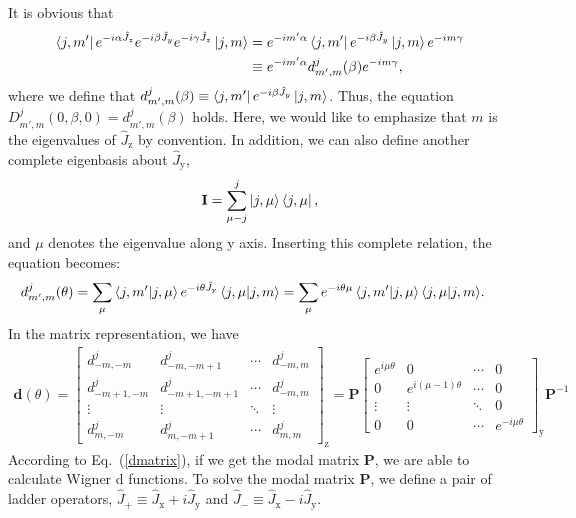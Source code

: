 \documentclass[journal=jacsat,manuscript=article,layout=traditional]{achemso}
\begin{document}
It is obvious that
\begin{align}
    \nonumber
    \bra{j,m'}e^{-i\alpha \hat{J}_z}e^{-i\beta \hat{J}_y}e^{-i\gamma \hat{J}_z}\ket{j,m}
    &=e^{-im'\alpha}\bra{j,m'}e^{-i\beta \hat{J}_y}\ket{j,m}e^{-im\gamma}\\
    &\equiv e^{-im'\alpha}d_{m',m}^j(\beta)e^{-im\gamma},
\end{align}
where we define that $d_{m',m}^j(\beta)\equiv\bra{j,m'}e^{-i\beta \hat{J}_y}\ket{j,m}$.
Thus, the equation $D_{m',m}^j(0,\beta,0)=d_{m',m}^j(\beta)$ holds.
Here, we would like to emphasize that $m$ is the eigenvalues of $\hat{J}_\mathrm{z}$ by convention.
In addition, we can also define another complete eigenbasis about $\hat{J}_\mathrm{y}$,
\begin{align}
    \mathbf{I}=\sum_{\mu-j}^j\ket{j,\mu}\bra{j,\mu},
\end{align}
and $\mu$ denotes the eigenvalue along y axis. 
Inserting this complete relation, the equation becomes:
\begin{align}
    d_{m',m}^{j}(\theta) &= \sum_\mu{\bra{j,m'}\ket{j,\mu}e^{-i\theta \hat{J}_\mathrm{y}}\bra{j,\mu}\ket{j,m}}
    = \sum_\mu{e^{-i\theta \mu}\bra{j,m'}\ket{j,\mu}\bra{j,\mu}\ket{j,m}}.
\end{align}
In the matrix representation, we have
\begin{align}
    \label{dmatrix}
    \mathbf{d}(\theta) =
    \begin{bmatrix}
    d_{-m,-m}^j & d_{-m,-m+1}^j & \cdots & d_{-m,m}^j\\
    d_{-m+1,-m}^j & d_{-m+1,-m+1}^j & \cdots & d_{-m,m}^j\\
    \vdots & \vdots & \ddots & \vdots\\
    d_{m,-m}^j & d_{m,-m+1}^j & \cdots & d_{m,m}^j
    \end{bmatrix}_\mathrm{z}
    = \mathbf{P}\begin{bmatrix}
    e^{i\mu\theta} & 0 & \cdots & 0\\
    0 & e^{i(\mu-1)\theta} & \cdots & 0\\
    \vdots & \vdots &\ddots & 0\\
    0 & 0 & \cdots & e^{-i\mu\theta}
    \end{bmatrix}_\mathrm{y}
    \mathbf{P}^{-1}
\end{align}
According to Eq.~(\ref{dmatrix}), if we get the modal matrix $\mathbf{P}$, we are able to calculate Wigner d functions.
To solve the modal matrix $\mathbf{P}$, we define a pair of ladder operators, $\hat{J}_+\equiv \hat{J}_\mathrm{x}+i\hat{J}_\mathrm{y}$ and $\hat{J}_-\equiv \hat{J}_\mathrm{x}-i\hat{J}_\mathrm{y}$.
\end{document}
